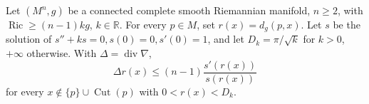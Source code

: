 Let \((M^n,g)\) be a connected complete smooth Riemannian manifold, \(n\ge2\), with \(\operatorname{Ric}\ge(n-1)k g\), \(k\in\mathbb R\). For every \(p\in M\), set \(r(x)=d_g(p,x)\). Let \(s\) be the solution of \(s''+ks=0,s(0)=0,s'(0)=1\), and let \(D_k=\pi/\sqrt{k}\) for \(k>0\), \(+\infty\) otherwise. With \(\Delta=\operatorname{div}\nabla\),
\[
\Delta r(x)\le(n-1)\frac{s'(r(x))}{s(r(x))}
\]
for every \(x\notin\{p\}\cup\operatorname{Cut}(p)\) with \(0<r(x)<D_k\).